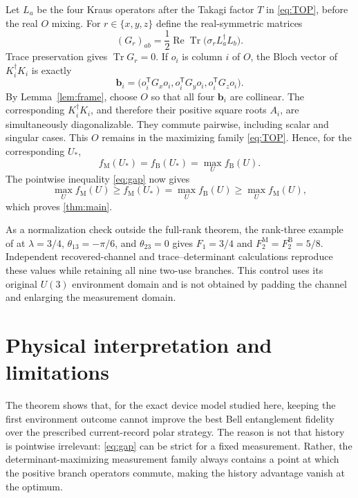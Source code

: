 \documentclass[11pt]{article}
\theoremstyle{remark}
\newcommand{\Tr}{\operatorname{Tr}}
\newcommand{\1}{\mathbb{I}}
\newcommand{\M}{\mathrm{M}}
\newcommand{\B}{\mathrm{B}}
\begin{document}
Let $L_a$ be the four Kraus operators after the Takagi factor $T$ in
\cref{eq:TOP}, before the real $O$ mixing.  For
$r\in\{x,y,z\}$ define the real-symmetric matrices
\begin{equation}
 (G_r)_{ab}=\frac12\operatorname{Re}\Tr
 \bigl(\sigma_rL_a^\dagger L_b\bigr).
 \label{eq:bloch-forms}
\end{equation}
Trace preservation gives $\Tr G_r=0$.  If $o_i$ is column $i$ of $O$, the
Bloch vector of
$K_i^\dagger K_i$ is exactly
\begin{equation}
 \bm b_i=\bigl(o_i^{\mathsf T}G_xo_i,
                    o_i^{\mathsf T}G_yo_i,
                    o_i^{\mathsf T}G_zo_i\bigr).
\end{equation}
By Lemma~\ref{lem:frame}, choose $O$ so that all four $\bm b_i$ are collinear.
The corresponding $K_i^\dagger K_i$, and therefore their positive square
roots $A_i$, are simultaneously diagonalizable.  They commute pairwise,
including scalar and singular cases.  This $O$ remains in the maximizing
family \cref{eq:TOP}.  Hence, for the corresponding $U_*$,
\begin{equation}
 f_{\M}(U_*)=f_{\B}(U_*)=\max_U f_{\B}(U).
\end{equation}
The pointwise inequality \cref{eq:gap} now gives
\begin{equation}
 \max_U f_{\M}(U)\geq f_{\M}(U_*)
 =\max_U f_{\B}(U)\geq\max_U f_{\M}(U),
\end{equation}
which proves \cref{thm:main}.

As a normalization check outside the full-rank theorem, the rank-three
example of \cite{RexitiEtAl2024} at
$\lambda=3/4$, $\theta_{13}=-\pi/6$, and $\theta_{23}=0$ gives
$F_1=3/4$ and $F_2^{\M}=F_2^{\B}=5/8$.  Independent recovered-channel and
trace--determinant calculations reproduce these values while retaining all
nine two-use branches.  This control uses its original $U(3)$ environment
domain and is not obtained by padding the channel and enlarging the
measurement domain.

\section{Physical interpretation and limitations}

The theorem shows that, for the exact device model studied here, keeping the
first environment outcome cannot improve the best Bell entanglement fidelity
over the prescribed current-record polar strategy.  The reason is not that
history is pointwise irrelevant: \cref{eq:gap} can be strict for a fixed
measurement.  Rather, the determinant-maximizing measurement family always
contains a point at which the positive branch operators commute, making the
history advantage vanish at the optimum.
\end{document}
